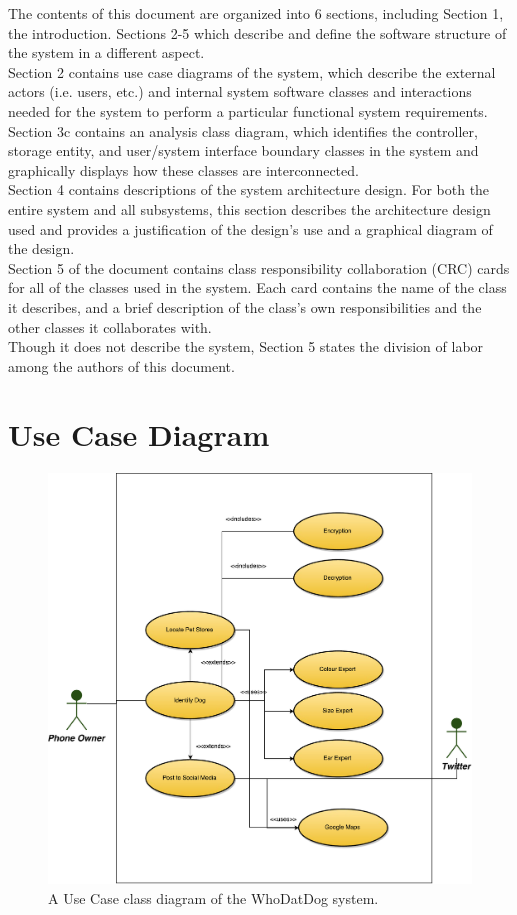 \documentclass[]{article}
\begin{document}
The contents of this document are organized into 6 sections, including Section 1, the introduction. Sections 2-5 which describe and define the software structure of the system in a different aspect.\\Section 2 contains use case diagrams of the system, which describe the external actors (i.e. users, etc.) and internal system software classes and interactions needed for the system to perform a particular functional system requirements.\\Section 3c contains an analysis class diagram, which identifies the controller, storage entity, and user/system interface boundary classes in the system and graphically displays how these classes are interconnected.\\Section 4 contains descriptions of the system architecture design. For both the entire system and all subsystems, this section describes the architecture design used and provides a justification of the design's use and a graphical diagram of the design.\\Section 5 of the document contains class responsibility collaboration (CRC) cards for all of the classes used in the system. Each card contains the name of the class it describes, and a brief description of the class's own responsibilities and the other classes it collaborates with.\\Though it does not describe the system, Section 5 states the division of labor among the authors of this document.

\section{Use Case Diagram}
\label{sec:use_case_diagram}
\begin{figure}[H]
	\centering
	\includegraphics[width=\textwidth]{UseCase.pdf}
	\caption{\label{fig:analysisclassdiagram} A Use Case class diagram of the WhoDatDog system.}
\end{figure}
\end{document}
